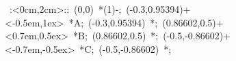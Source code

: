 %


\hbox{
\xy    <2cm,0cm>:<0cm,2cm>::
       (0,0) *\ellipse(1){-}; 
       (-0.3,0.95394)+<-0.5em,1ex> *{A};
       (-0.3,0.95394) *{\bullet};
       (0.86602,0.5)+<0.7em,0.5ex> *{B};  
       (0.86602,0.5) *{\bullet};  
       (-0.5,-0.86602)+<-0.7em,-0.5ex> *{C};  
       (-0.5,-0.86602) *{\bullet};  
\endxy}

